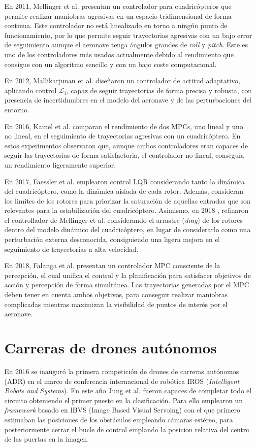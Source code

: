 En 2011, Mellinger et al. \cite{MinimunSnap2011} presentan un controlador para cuadricópteros que permite realizar maniobras agresivas en un espacio tridimensional de forma continua. Este controlador no está linealizado en torno a ningún punto de funcionamiento, por lo que permite seguir trayectorias agresivas con un bajo error de seguimiento aunque el aeronave tenga ángulos grandes de \textit{roll} y \textit{pitch}. Este es uno de los controladores más usados actualmente debido al rendimiento que consigue con un algoritmo sencillo y con un bajo coste computacional.

En 2012, Mallikarjunan et al. \cite{mallikarjunan2012l1} diseñaron un controlador de actitud adaptativo, aplicando control $\mathcal{L}_1$, capaz de seguir trayectorias de forma precisa y robusta, con presencia de incertidumbres en el modelo del aeronave y de las perturbaciones del entorno.

En 2016, Kamel et al. \cite{KamelMPC2016} comparan el rendimiento de dos MPCs, uno lineal y uno no lineal, en el seguimiento de trayectorias agresivas con un cuadricóptero. En estos experimentos observaron que, aunque ambos controladores eran capaces de seguir las trayectorias de forma satisfactoria, el controlador no lineal, conseguía un rendimiento ligeramente superior.

En 2017, Faessler et al. \cite{Faessler17ral} emplearon control LQR considerando tanto la dinámica del cuadricóptero, como la dinámica aislada de cada rotor. Además, consideran los limites de los rotores para priorizar la saturación de aquellas entradas que son relevantes para la estabilización del cuadricóptero. Asimismo, en 2018 \cite{Faessler18ral}, refinaron el controllador de Mellinger et al. considerando el arrastre (\textit{drag}) de los rotores dentro del modelo dinámico del cuadricóptero, en lugar de considerarlo como una perturbación externa desconocida, consiguiendo una ligera mejora en el seguimiento de trayectorias a alta velocidad.
 
En 2018, Falanga et al. \cite{falanga2018pampc} presentan un controlador MPC consciente de la percepción, el cual unifica el control y la planificación para satisfacer objetivos de acción y percepción de forma simultánea. Las trayectorias generadas por el MPC deben tener en cuenta ambos objetivos, para conseguir realizar maniobras complicadas mientras maximizan la visibilidad de puntos de interés por el aeronave.


\section{Carreras de drones autónomos}
En 2016 se inauguró la primera competición de drones de carreras autónomos (ADR) en el marco de conferencia internacional de robótica IROS (\textit{Intelligent Robots and Systems}). En este año Jung et al.\cite{iros2016} fueron capaces de completar todo el circuito obteniendo el primer puesto en la clasificación. Para ello emplearon un \textit{framework} basado en IBVS (Image Based Visual Servoing) con el que primero estimaban las posiciones de los obstáculos empleando cámaras estéreo, para posteriormente cerrar el bucle de control emplando la posicion relativa del centro de las puertas en la imagen. 

